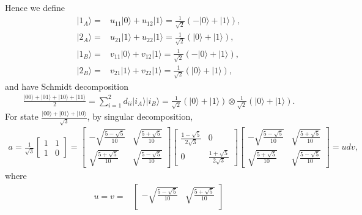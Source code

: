\documentclass[en]{sol-man}
\begin{document}
\begin{pf}
    Hence we define
    \begin{align}
        \lvert 1_A\rangle=&u_{11}\lvert 0\rangle+u_{12}\lvert 1\rangle=\frac{1}{\sqrt{2}}(-\lvert 0\rangle+\lvert 1\rangle),\\
        \lvert 2_A\rangle=&u_{21}\lvert 1\rangle+u_{22}\lvert 1\rangle=\frac{1}{\sqrt{2}}(\lvert 0\rangle+\lvert 1\rangle),\\
        \lvert 1_B\rangle=&v_{11}\lvert 0\rangle+v_{12}\lvert 1\rangle=\frac{1}{\sqrt{2}}(-\lvert 0\rangle+\lvert 1\rangle),\\
        \lvert 2_B\rangle=&v_{21}\lvert 1\rangle+v_{22}\lvert 1\rangle=\frac{1}{\sqrt{2}}(\lvert 0\rangle+\lvert 1\rangle),
    \end{align}
    and have Schmidt decomposition
    \begin{align}
        \frac{\lvert 00\rangle+\lvert 01\rangle+\lvert 10\rangle+\lvert 11\rangle}{2}=\sum_{i=1}^2d_{ii}\lvert i_A\rangle\lvert i_B\rangle=\frac{1}{\sqrt{2}}(\lvert 0\rangle+\lvert 1\rangle)\otimes\frac{1}{\sqrt{2}}(\lvert 0\rangle+\lvert 1\rangle).
    \end{align}
    For state $\frac{\lvert 00\rangle+\lvert 01\rangle+\lvert 10\rangle}{\sqrt{3}}$, by singular decomposition,
    \begin{align}
        a=\frac{1}{\sqrt{3}}\begin{bmatrix}
            1&1\\
            1&0
        \end{bmatrix}=\begin{bmatrix}
            -\sqrt{\frac{5-\sqrt{5}}{10}}&\sqrt{\frac{5+\sqrt{5}}{10}}\\
            \sqrt{\frac{5+\sqrt{5}}{10}}&\sqrt{\frac{5-\sqrt{5}}{10}}
        \end{bmatrix}\begin{bmatrix}
            \frac{1-\sqrt{5}}{2\sqrt{3}}&0\\
            0&\frac{1+\sqrt{5}}{2\sqrt{3}}
        \end{bmatrix}\begin{bmatrix}
            -\sqrt{\frac{5-\sqrt{5}}{10}}&\sqrt{\frac{5+\sqrt{5}}{10}}\\
            \sqrt{\frac{5+\sqrt{5}}{10}}&\sqrt{\frac{5-\sqrt{5}}{10}}
        \end{bmatrix}=udv,
    \end{align}
    where
    \begin{align}
        u=v=&\begin{bmatrix}
            -\sqrt{\frac{5-\sqrt{5}}{10}}&\sqrt{\frac{5+\sqrt{5}}{10}}\\

\end{bmatrix}
\end{align}
\end{pf}
\end{document}
